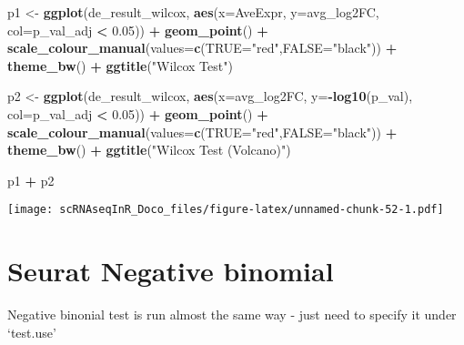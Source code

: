 \documentclass[
]{book}
\newenvironment{Shaded}{\begin{snugshade}}{\end{snugshade}}
\newcommand{\AttributeTok}[1]{\textcolor[rgb]{0.13,0.29,0.53}{#1}}
\newcommand{\FloatTok}[1]{\textcolor[rgb]{0.00,0.00,0.81}{#1}}
\newcommand{\FunctionTok}[1]{\textcolor[rgb]{0.13,0.29,0.53}{\textbf{#1}}}
\newcommand{\NormalTok}[1]{#1}
\newcommand{\OtherTok}[1]{\textcolor[rgb]{0.56,0.35,0.01}{#1}}
\newcommand{\SpecialCharTok}[1]{\textcolor[rgb]{0.81,0.36,0.00}{\textbf{#1}}}
\newcommand{\StringTok}[1]{\textcolor[rgb]{0.31,0.60,0.02}{#1}}
\begin{document}
\begin{Shaded}
\begin{Highlighting}[]
\NormalTok{p1 }\OtherTok{\textless{}{-}} \FunctionTok{ggplot}\NormalTok{(de\_result\_wilcox, }\FunctionTok{aes}\NormalTok{(}\AttributeTok{x=}\NormalTok{AveExpr, }\AttributeTok{y=}\NormalTok{avg\_log2FC, }\AttributeTok{col=}\NormalTok{p\_val\_adj }\SpecialCharTok{\textless{}} \FloatTok{0.05}\NormalTok{)) }\SpecialCharTok{+}
  \FunctionTok{geom\_point}\NormalTok{() }\SpecialCharTok{+}
  \FunctionTok{scale\_colour\_manual}\NormalTok{(}\AttributeTok{values=}\FunctionTok{c}\NormalTok{(}\StringTok{\textquotesingle{}TRUE\textquotesingle{}}\OtherTok{=}\StringTok{"red"}\NormalTok{,}\StringTok{\textquotesingle{}FALSE\textquotesingle{}}\OtherTok{=}\StringTok{"black"}\NormalTok{)) }\SpecialCharTok{+} 
  \FunctionTok{theme\_bw}\NormalTok{() }\SpecialCharTok{+}
  \FunctionTok{ggtitle}\NormalTok{(}\StringTok{"Wilcox Test"}\NormalTok{)}


\NormalTok{p2 }\OtherTok{\textless{}{-}} \FunctionTok{ggplot}\NormalTok{(de\_result\_wilcox, }\FunctionTok{aes}\NormalTok{(}\AttributeTok{x=}\NormalTok{avg\_log2FC, }\AttributeTok{y=}\SpecialCharTok{{-}}\FunctionTok{log10}\NormalTok{(p\_val), }\AttributeTok{col=}\NormalTok{p\_val\_adj }\SpecialCharTok{\textless{}} \FloatTok{0.05}\NormalTok{)) }\SpecialCharTok{+}
  \FunctionTok{geom\_point}\NormalTok{() }\SpecialCharTok{+}
  \FunctionTok{scale\_colour\_manual}\NormalTok{(}\AttributeTok{values=}\FunctionTok{c}\NormalTok{(}\StringTok{\textquotesingle{}TRUE\textquotesingle{}}\OtherTok{=}\StringTok{"red"}\NormalTok{,}\StringTok{\textquotesingle{}FALSE\textquotesingle{}}\OtherTok{=}\StringTok{"black"}\NormalTok{)) }\SpecialCharTok{+} 
  \FunctionTok{theme\_bw}\NormalTok{() }\SpecialCharTok{+}
  \FunctionTok{ggtitle}\NormalTok{(}\StringTok{"Wilcox Test (Volcano)"}\NormalTok{)}

\NormalTok{p1 }\SpecialCharTok{+}\NormalTok{ p2}
\end{Highlighting}
\end{Shaded}

\texttt{[image: scRNAseqInR\_Doco\_files/figure-latex/unnamed-chunk-52-1.pdf]}

\hypertarget{seurat-negative-binomial}{%
\section{Seurat Negative binomial}\label{seurat-negative-binomial}}

Negative binonial test is run almost the same way - just need to specify it under `test.use'
\end{document}
